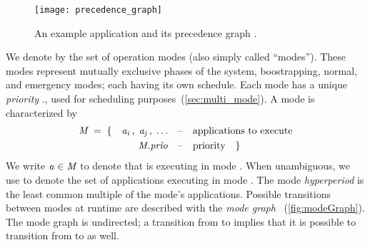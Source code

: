 \begin{figure}
\centering
\texttt{[image: precedence\_graph]}
\caption{An example application and its precedence graph \predG.
}
\label{fig:precedence_graph}
\end{figure}

\pagebreak

We denote by \modeset the set of operation modes (also simply called ``modes'').
These modes represent mutually exclusive phases of the system, \eg boostrapping, normal, and emergency modes; each having its own schedule.
Each mode has a unique \emph{priority} \modeany.\prio, used for scheduling purposes~(\cref{sec:multi_mode}).
A mode \modeany is characterized by
\begin{align*}
\mathit{M_{}} \; = \; \{ \quad
	 \mathit{a_{i}}\, , \;
	 \mathit{a_{j}}\, , \; \ldots
	\quad &\text{--\quad applications to execute}\\
	 \mathit{M_{}}.\mathit{prio}
	\quad &\text{--\quad priority} \quad \}
\end{align*}
We write $\mathit{a_{}} \in \mathit{M_{}}$ to denote that \app is executing in mode \modeany.
When unambiguous, we use \modeany to denote the set of applications executing in mode \modeany.
The mode \emph{hyperperiod} \modeHyperperiod is the least common multiple of the mode's applications.
Possible transitions between modes at runtime are described with the \emph{mode graph} \modeGraph~(\cref{fig:modeGraph}). The mode graph is undirected; a transition from \modei to \modej implies that it is possible to transition from \modej to \modei as well.



